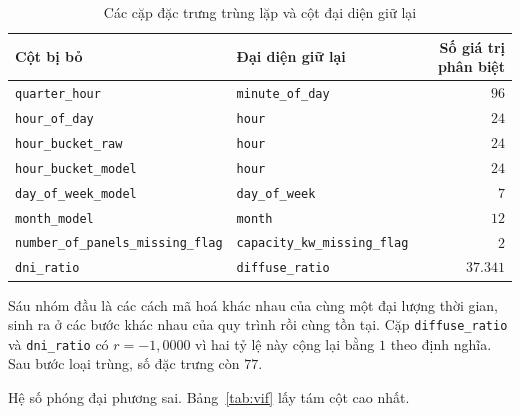 \documentclass[12pt, a4paper]{report}
\begin{document}
\begin{table}[htbp]
\centering
\caption{Các cặp đặc trưng trùng lặp và cột đại diện giữ lại}
\label{tab:trung_lap}
\footnotesize
\begin{tabular}{l l r}
\toprule
\textbf{Cột bị bỏ} & \textbf{Đại diện giữ lại} & \textbf{Số giá trị phân biệt} \\
\midrule
\texttt{quarter\_hour}                  & \texttt{minute\_of\_day}            & $96$ \\
\texttt{hour\_of\_day}                  & \texttt{hour}                       & $24$ \\
\texttt{hour\_bucket\_raw}              & \texttt{hour}                       & $24$ \\
\texttt{hour\_bucket\_model}            & \texttt{hour}                       & $24$ \\
\texttt{day\_of\_week\_model}           & \texttt{day\_of\_week}              & $7$ \\
\texttt{month\_model}                   & \texttt{month}                      & $12$ \\
\texttt{number\_of\_panels\_missing\_flag} & \texttt{capacity\_kw\_missing\_flag} & $2$ \\
\texttt{dni\_ratio}                     & \texttt{diffuse\_ratio}             & $37.341$ \\
\bottomrule
\end{tabular}


\end{table}

Sáu nhóm đầu là các cách mã hoá khác nhau của cùng một đại lượng thời gian, sinh ra ở các bước
khác nhau của quy trình rồi cùng tồn tại. Cặp \texttt{diffuse\_ratio} và \texttt{dni\_ratio} có
$r = -1{,}0000$ vì hai tỷ lệ này cộng lại bằng $1$ theo định nghĩa. Sau bước loại trùng, số đặc
trưng còn $77$.

Hệ số phóng đại phương sai. Bảng~\ref{tab:vif} lấy tám cột cao nhất.
\end{document}
